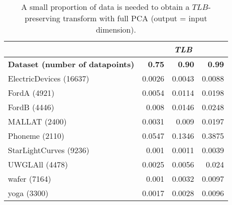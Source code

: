 \begin{table}[]
\centering
\scriptsize
\caption{A small proportion of data is needed to obtain a $TLB$-preserving transform with full PCA (output = input dimension).}

\begin{tabular}{|l|r|r|r|}
\hline
                               & \multicolumn{3}{c|}{\textit{\textbf{TLB}}}    \\ \hline
\textbf{Dataset (number of datapoints)}               & \textbf{0.75} & \textbf{0.90} & \textbf{0.99} \\ \hline
ElectricDevices (16637)               & 0.0026        & 0.0043        & 0.0088        \\ \hline
FordA   (4921)                       & 0.0054        & 0.0114        & 0.0198        \\ \hline
FordB   (4446)                       & 0.008         & 0.0146        & 0.0248        \\ \hline
MALLAT  (2400)                       & 0.0031        & 0.009         & 0.0197        \\ \hline
Phoneme   (2110)                     & 0.0547        & 0.1346        & 0.3875        \\ \hline
StarLightCurves (9236)               & 0.001         & 0.0011        & 0.0039        \\ \hline
UWGLAll  (4478)       & 0.0025        & 0.0056        & 0.024         \\ \hline
wafer  (7164)                        & 0.001         & 0.0032        & 0.0097        \\ \hline
yoga  (3300)                         & 0.0017        & 0.0028        & 0.0096        \\ \hline
\end{tabular}
\label{tab:sample}
\end{table}






